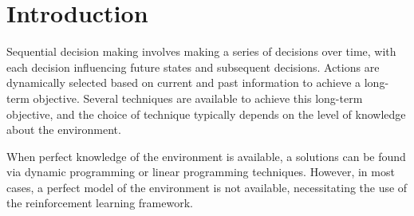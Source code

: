 \chapter*{Introduction}
\label{ch:Introduction}

Sequential decision making involves making a series of decisions over time, with each decision influencing future states and subsequent decisions. 
Actions are dynamically selected based on current and past information to achieve a long-term objective. 
Several techniques are available to achieve this long-term objective, and the choice of technique typically depends on the level of 
knowledge about the environment.

When perfect knowledge of the environment is available, a solutions can be found via dynamic programming or linear programming techniques. 
However, in most cases, a perfect model of the environment is not available, necessitating the use of the reinforcement learning framework.

